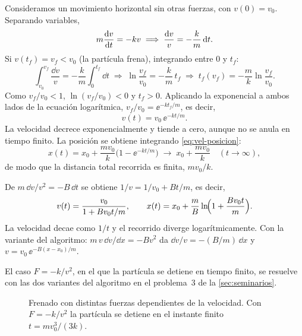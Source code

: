 \begin{example}[arrastre lineal, $F(v)=-kv$]
Consideramos un movimiento horizontal sin otras fuerzas, con $v(0)=v_0$. Separando variables,
\[
  m\dfrac{\mathrm{d} v}{\mathrm{d} t}=-kv\;\Longrightarrow\;\frac{\mathrm{d} v}{v}=-\frac{k}{m}\,\mathrm{d} t .
\]
Si $v(t_f)=v_f<v_0$ (la partícula frena), integrando entre $0$ y $t_f$:
\[
  \int_{v_0}^{v_f}\frac{\dd v}{v}=-\frac km\int_0^{t_f}\dd t
  \;\Longrightarrow\;
  \ln\frac{v_f}{v_0}=-\frac km\,t_f
  \;\Longrightarrow\;
  t_f(v_f)=-\frac mk\ln\frac{v_f}{v_0}.
\]
Como $v_f/v_0<1$, $\ln(v_f/v_0)<0$ y $t_f>0$. Aplicando la exponencial a ambos lados de la ecuación logarítmica, $v_f/v_0=\ee^{-kt_f/m}$, es decir,
\begin{equation}
  v(t)=v_0\,\ee^{-kt/m}.
  \label{eq:vel-lineal}
\end{equation}
La velocidad decrece exponencialmente y tiende a cero, aunque no se anula en tiempo finito. La posición se obtiene integrando \eqref{eq:vel-posicion}:
\[
  x(t)=x_0+\frac{mv_0}{k}\bigl(1-\ee^{-kt/m}\bigr)\;\longrightarrow\;x_0+\frac{mv_0}{k}\quad(t\to\infty),
\]
de modo que la distancia total recorrida es finita, $mv_0/k$.\finejemplo
\end{example}

\begin{example}[arrastre cuadrático, $F(v)=-Bv^2$]
De $m\,\dd v/v^2=-B\,\dd t$ se obtiene $1/v=1/v_0+Bt/m$, es decir,
\[
  v(t)=\frac{v_0}{1+Bv_0t/m},\qquad x(t)=x_0+\frac mB\ln\!\Bigl(1+\frac{Bv_0t}{m}\Bigr).
\]
La velocidad decae como $1/t$ y el recorrido diverge logarítmicamente. Con la variante del algoritmo: $m\,v\,\dd v/\dd x=-Bv^2$ da $\dd v/v=-(B/m)\,\dd x$ y $v=v_0\,\ee^{-B(x-x_0)/m}$.\finejemplo
\end{example}

El caso $F=-k/v^2$, en el que la partícula se detiene en tiempo finito, se resuelve con las dos variantes del algoritmo en el problema~3 de la \cref{sec:seminarios}.

\begin{figure}[H]
  \centering
  \caption{Frenado con distintas fuerzas dependientes de la velocidad. Con $F=-k/v^2$ la partícula se detiene en el instante finito $t=mv_0^3/(3k)$.}
  \label{fig:velocidad}
\end{figure}

\newpage
